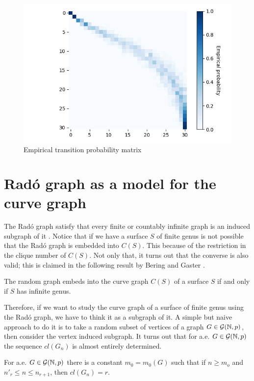 \clearpage
\begin{figure}[h!]
	\centering
	\includegraphics[scale=0.7]{Python/Figures/Transition-matrix-secuence-of-rigid-expansions.png}
	\caption{Empirical transition probability matrix}
\end{figure}


\section{Radó graph as a model for the curve graph}
The Radó graph satisfy that every finite or countably infinite graph is an induced subgraph of it \cite{DarReferenciaAqui1}. Notice that if we have a surface $S$ of finite genus is not possible that the Radó graph is embedded into $C(S)$. This because of the restriction in the clique number of $C(S)$. Not only that, it turns out that the converse is also valid; this is claimed in the following result by Bering and Gaster \cite{beringGaster}.

\begin{theorem}
The random graph embeds into the curve graph $C(S)$ of a surface $S$ if and only if $S$ has infinite genus.
\end{theorem}

Therefore, if we want to study the curve graph of a surface of finite genus using the Radó graph, we have to think it as a subgraph of it. A simple but naive approach to do it is to take a random subset of vertices of a graph $G\in \mathcal{G}(\mathbb{N}, p)$, then consider the vertex induced subgraph. It turns out that for a.e. $G\in \mathcal{G}(\mathbb{N}, p)$ the sequence $cl(G_n)$ is almost entirely determined.

\begin{theorem}
For a.e. $G \in \mathcal{G}(\mathbb{N},p)$ there is a constant $m_0 = m_{0}(G)$ such that if $n \geq m_o$ and $n'_{r} \leq n \leq n_{r+1}$, then $cl(G_{n}) = r$.
\end{theorem}

